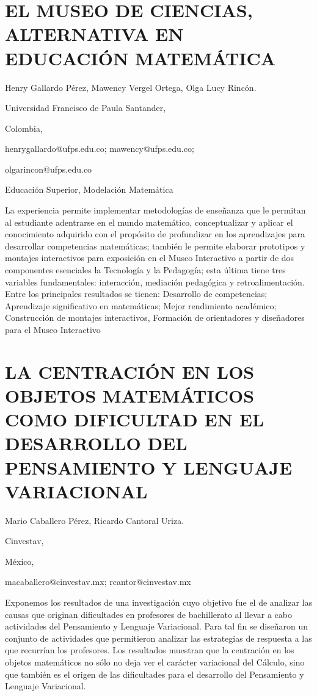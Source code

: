 \section{EL MUSEO DE CIENCIAS, ALTERNATIVA EN EDUCACIÓN MATEMÁTICA}

\begin{datos}

Henry Gallardo Pérez, Mawency Vergel Ortega, Olga Lucy Rincón.

Universidad Francisco de Paula Santander,

Colombia,

henrygallardo@ufps.edu.co; mawency@ufps.edu.co;

olgarincon@ufps.edu.co 

\end{datos}

Educación Superior, Modelación Matemática 

La experiencia permite implementar metodologías de enseñanza que le
permitan al estudiante adentrarse en el mundo matemático, conceptualizar
y aplicar el conocimiento adquirido con el propósito de profundizar
en los aprendizajes para desarrollar competencias matemáticas; también
le permite elaborar prototipos y montajes interactivos para exposición
en el Museo Interactivo a partir de dos componentes esenciales la
Tecnología y la Pedagogía; esta última tiene tres variables fundamentales:
interacción, mediación pedagógica y retroalimentación. Entre los principales
resultados se tienen: Desarrollo de competencias; Aprendizaje significativo
en matemáticas; Mejor rendimiento académico; Construcción de montajes
interactivos, Formación de orientadores y diseñadores para el Museo
Interactivo 


\section{LA CENTRACIÓN EN LOS OBJETOS MATEMÁTICOS COMO DIFICULTAD EN EL DESARROLLO
DEL PENSAMIENTO Y LENGUAJE VARIACIONAL }

\begin{datos}

Mario Caballero Pérez, Ricardo Cantoral Uriza.

Cinvestav, 

México,

macaballero@cinvestav.mx; rcantor@cinvestav.mx 

\end{datos}

Exponemos los resultados de una investigación cuyo objetivo fue el
de analizar las causas que originan dificultades en profesores de
bachillerato al llevar a cabo actividades del Pensamiento y Lenguaje
Variacional. Para tal fin se diseñaron un conjunto de actividades
que permitieron analizar las estrategias de respuesta a las que recurrían
los profesores. Los resultados muestran que la centración en los objetos
matemáticos no sólo no deja ver el carácter variacional del Cálculo,
sino que también es el origen de las dificultades para el desarrollo
del Pensamiento y Lenguaje Variacional.


